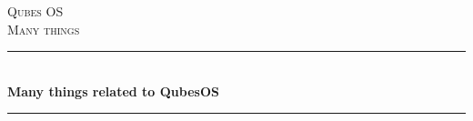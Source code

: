 \documentclass[12pt]{article}
\begin{document}
\begin{titlepage}

  \newcommand{\HRule}{\rule{\linewidth}{0.5mm}} %

  \center %


  \textsc{\LARGE Qubes OS}\\[1.5cm] %
  \textsc{\Large Many things}\\[0.5cm] %


  \HRule \\[0.4cm]
  { \huge \bfseries Many things related to QubesOS}\\[0.4cm] %
  \HRule \\[1.5cm]




\end{titlepage}
\end{document}
